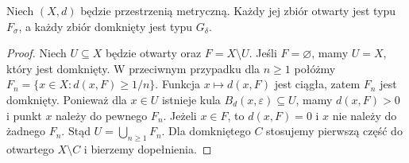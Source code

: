\begin{lemat}
\label{lem:topog-polskie-otwarte-fsigma}
Niech $(X,d)$ będzie przestrzenią
metryczną. Każdy jej zbiór otwarty
jest typu $F_\sigma$, a każdy
zbiór domknięty jest typu $G_\delta$.
\end{lemat}
\begin{proof}
Niech $U\subseteq X$ będzie otwarty
oraz $F=X\setminus U$.
Jeśli $F=\varnothing$, mamy
$U=X$, który jest domknięty.
W przeciwnym przypadku
dla $n\ge1$ połóżmy
$F_n=\{x\in X:d(x,F)\ge1/n\}$.
Funkcja $x\mapsto d(x,F)$
jest ciągła, zatem $F_n$ jest
domknięty. Ponieważ dla
$x\in U$ istnieje kula
$B_d(x,\varepsilon)\subseteq U$,
mamy $d(x,F)>0$ i punkt $x$
należy do pewnego $F_n$.
Jeżeli $x\in F$, to
$d(x,F)=0$ i $x$ nie należy
do żadnego $F_n$. Stąd
$U=\bigcup_{n\ge1}F_n$.
Dla domkniętego $C$ stosujemy
pierwszą część do otwartego
$X\setminus C$ i bierzemy
dopełnienia.
\end{proof}

